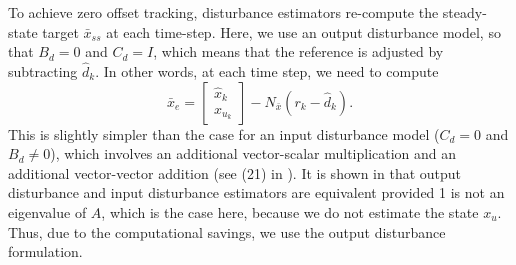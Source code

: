 \documentclass[twocolumn,twoside]{IEEEtran}
\newcommand{\x}{\ensuremath{x }\xspace}
\newcommand{\xdss}{\ensuremath{\bar x_{ss} }\xspace}
\begin{document}
To achieve zero offset tracking, disturbance estimators re-compute the steady-state target $\xdss$ at each time-step. Here, we use an output disturbance model, so that $B_d=0$ and $C_d=I$, which means that the reference is adjusted by subtracting $\hat d_k$. In other words, at each time step, we need to compute
\begin{equation}
  \bar{x}_{e} =
  \begin{bmatrix}\hat{x}_k\\x_{u_k}
  \end{bmatrix}
  - N_{\bar{x}}(r_k - \hat{d}_k).\nonumber
\end{equation}
This is slightly simpler than the case for an input disturbance model ($C_d=0$ and $B_d\neq0$), which involves an additional vector-scalar multiplication and an additional vector-vector addition (see (21) in \cite{maeder_offset-free_2007}). It is shown in \cite{maeder_offset-free_2007} that output disturbance and input disturbance estimators are equivalent provided 1 is not an eigenvalue of $A$, which is the case here, because we do not estimate the state $x_u$. Thus, due to the computational savings, we use the output disturbance formulation. 
\end{document}
